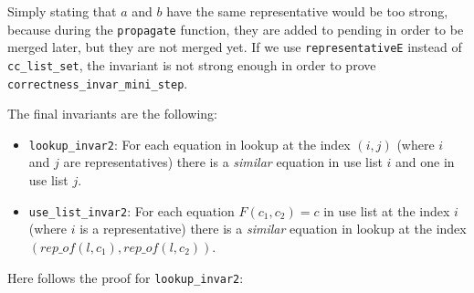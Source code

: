 Simply stating that $a$ and $b$ have the same representative would be too strong, because during the \lstinline|propagate| function, they are added to pending in order to be merged later, but they are not merged yet. If we use \lstinline{representativeE} instead of \lstinline{cc_list_set}, the invariant is not strong enough in order to prove \lstinline{correctness_invar_mini_step}.

The final invariants are the following:
\begin{itemize}
    \item \lstinline{lookup_invar2}: For each equation in lookup at the index $(i, j)$ (where $i$ and $j$ are representatives) there is a \emph{similar} equation in use list $i$ and one in use list $j$.
	\item \lstinline{use_list_invar2}: For each equation $F(c_1, c_2) = c$ in use list at the index $i$ (where $i$ is a representative) there is a \emph{similar} equation in lookup at the index $(rep\_of(l, c_1), rep\_of(l, c_2))$.
\end{itemize}

Here follows the proof for \lstinline{lookup_invar2}:

